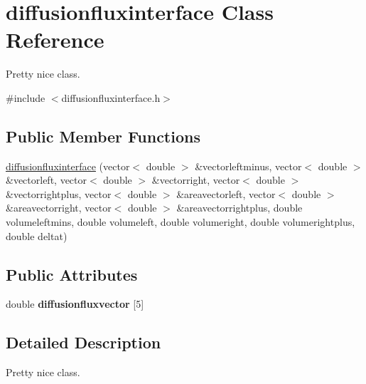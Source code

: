 \hypertarget{classdiffusionfluxinterface}{}\section{diffusionfluxinterface Class Reference}
\label{classdiffusionfluxinterface}


Pretty nice class.  




{\ttfamily \#include $<$diffusionfluxinterface.\+h$>$}

\subsection*{Public Member Functions}
\begin{DoxyCompactItemize}
\item 
\hyperlink{classdiffusionfluxinterface_accd979d36df59f70877631b7a4e81ef6}{diffusionfluxinterface} (vector$<$ double $>$ \&vectorleftminus, vector$<$ double $>$ \&vectorleft, vector$<$ double $>$ \&vectorright, vector$<$ double $>$ \&vectorrightplus, vector$<$ double $>$ \&areavectorleft, vector$<$ double $>$ \&areavectorright, vector$<$ double $>$ \&areavectorrightplus, double volumeleftmins, double volumeleft, double volumeright, double volumerightplus, double deltat)
\end{DoxyCompactItemize}
\subsection*{Public Attributes}
\begin{DoxyCompactItemize}
\item 
double {\bfseries diffusionfluxvector} \mbox{[}5\mbox{]}\hypertarget{classdiffusionfluxinterface_a3762b8e36767080ef771b075aee10be5}{}\label{classdiffusionfluxinterface_a3762b8e36767080ef771b075aee10be5}

\end{DoxyCompactItemize}


\subsection{Detailed Description}
Pretty nice class. 

